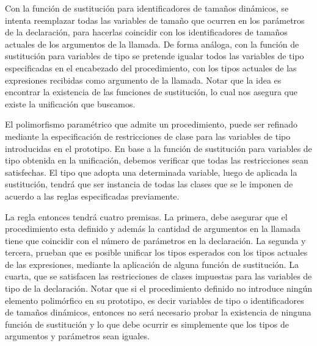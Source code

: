 Con la función de sustitución para identificadores de tamaños dinámicos, se intenta reemplazar todas las variables de tamaño que ocurren en los parámetros de la declaración, para hacerlas coincidir con los identificadores de tamaños actuales de los argumentos de la llamada.
De forma análoga, con la función de sustitución para variables de tipo se pretende igualar todos las variables de tipo especificadas en el encabezado del procedimiento, con los tipos actuales de las expresiones recibidas como argumento de la llamada.
Notar que la idea es encontrar la existencia de las funciones de sustitución, lo cual nos asegura que existe la unificación que buscamos.

El polimorfismo paramétrico que admite un procedimiento, puede ser refinado mediante la especificación de restricciones de clase para las variables de tipo introducidas en el prototipo.
En base a la función de sustitución para variables de tipo obtenida en la unificación, debemos verificar que todas las restricciones sean satisfechas.
El tipo que adopta una determinada variable, luego de aplicada la sustitución, tendrá que ser instancia de todas las clases que se le imponen de acuerdo a las reglas especificadas previamente.

La regla entonces tendrá cuatro premisas.
La primera, debe asegurar que el procedimiento esta definido y además la cantidad de argumentos en la llamada tiene que coincidir con el número de parámetros en la declaración.
La segunda y tercera, prueban que es posible unificar los tipos esperados con los tipos actuales de las expresiones, mediante la aplicación de alguna función de sustitución.
La cuarta, que se satisfacen las restricciones de clases impuestas para las variables de tipo de la declaración.
Notar que si el procedimiento definido no introduce ningún elemento polimórfico en su prototipo, es decir variables de tipo o identificadores de tamaños dinámicos, entonces no será necesario probar la existencia de ninguna función de sustitución y lo que debe ocurrir es simplemente que los tipos de argumentos y parámetros sean iguales.

